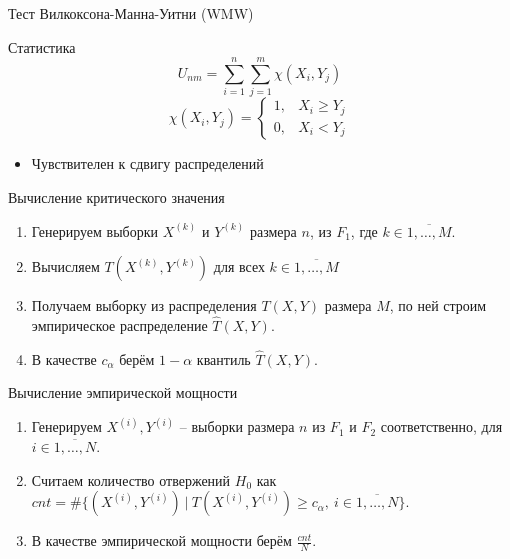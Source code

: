 \documentclass[handout]{beamer}
\begin{document}
\begin{frame}{Тест Вилкоксона-Манна-Уитни (WMW)}
	    \begin{block}{Статистика}
		        \[
		        U_{nm} = \sum_{i=1}^n \sum_{j=1}^m \chi(X_i, Y_j)
		        \]
		        \[
		        \chi(X_i, Y_j) = 
		        \begin{cases}
			        1, & X_i \geq Y_j \\
			        0, & X_i < Y_j
			        \end{cases}
		        \]
		    \end{block}
	    
	    \begin{itemize}
		        \item Чувствителен к сдвигу распределений
		    \end{itemize}
	\end{frame}

\begin{frame}{Вычисление критического значения}
	\begin{enumerate}
		\item Генерируем выборки $X^{(k)}$ и $Y^{(k)}$ размера $n$, из $F_1$, где $k \in \overline{1,\ldots, M}$.
		\pause
		\item Вычисляем $T(X^{(k)}, Y^{(k)})$ для всех $k \in \overline{1,\ldots, M}$
		\pause
		\item Получаем выборку из распределения $T(X,Y)$ размера $M$, по ней строим эмпирическое распределение $\hat{T}(X,Y)$.
		\pause
		\item В качестве $c_{\alpha}$ берём $1 - \alpha$ квантиль $\hat{T}(X,Y)$.
	\end{enumerate}
\end{frame}


\begin{frame}{Вычисление эмпирической мощности}
	\begin{enumerate}
		\item Генерируем $X^{(i)}, Y^{(i)}$ -- выборки размера $n$ из $F_1$ и $F_2$ соответственно, для $i \in \overline{1,\ldots, N}$.
		\pause
		\item Считаем количество отвержений $H_0$ как $cnt =  \#\{ (X^{(i)},Y^{(i)}) \ | \ T(X^{(i)}, Y^{(i)}) \geqslant c_{\alpha}, \ i \in \overline{1,\ldots, N} \}$.
		\pause
		\item В качестве эмпирической мощности берём $ \frac{cnt}{N}$.
	\end{enumerate}
\end{frame}
\end{document}
